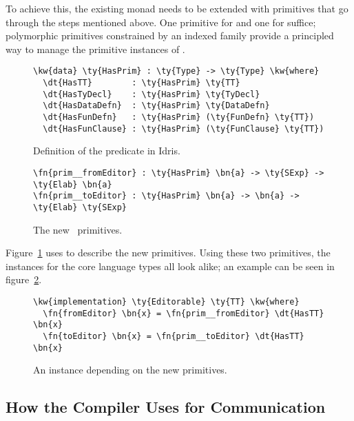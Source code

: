 To achieve this, the existing \Elab{} monad needs to be extended with
primitives that go through the steps mentioned above.  One \Elab{} primitive
for  and one for  suffice; polymorphic
primitives constrained by an indexed family provide a principled
way to manage the primitive instances of \Editorable{}.

\begin{figure}[H]
\begin{Verbatim}
\kw{data} \ty{HasPrim} : \ty{Type} -> \ty{Type} \kw{where}
  \dt{HasTT}        : \ty{HasPrim} \ty{TT}
  \dt{HasTyDecl}    : \ty{HasPrim} \ty{TyDecl}
  \dt{HasDataDefn}  : \ty{HasPrim} \ty{DataDefn}
  \dt{HasFunDefn}   : \ty{HasPrim} (\ty{FunDefn} \ty{TT})
  \dt{HasFunClause} : \ty{HasPrim} (\ty{FunClause} \ty{TT})
\end{Verbatim}
\caption{Definition of the  predicate in Idris.}
\end{figure}


\begin{figure}
\begin{Verbatim}
\fn{prim__fromEditor} : \ty{HasPrim} \bn{a} -> \ty{SExp} -> \ty{Elab} \bn{a}
\fn{prim__toEditor} : \ty{HasPrim} \bn{a} -> \bn{a} -> \ty{Elab} \ty{SExp}
\end{Verbatim}
  \caption{The new \Elab\ primitives.}
\label{code:newElabPrims}
\end{figure}

Figure~\ref{code:newElabPrims} uses  to describe the new \Elab{} primitives.
Using these two primitives, the \Editorable{} instances for the core language
types all look alike; an example can be seen in figure~\ref{fig:editorablePrim}.

\begin{figure}
\begin{Verbatim}
\kw{implementation} \ty{Editorable} \ty{TT} \kw{where}
  \fn{fromEditor} \bn{x} = \fn{prim__fromEditor} \dt{HasTT} \bn{x}
  \fn{toEditor} \bn{x} = \fn{prim__toEditor} \dt{HasTT} \bn{x}
\end{Verbatim}
\caption{An \Editorable{} instance depending on the new primitives.}
\label{fig:editorablePrim}
\end{figure}

\subsection{How the Compiler Uses \Editorable{} for Communication}
\label{ssec:communication}


